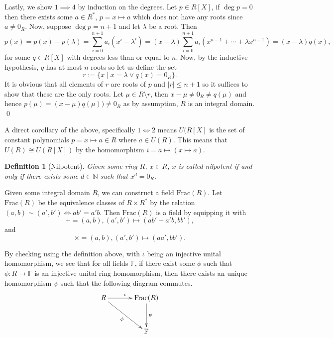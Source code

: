 \documentclass[
]{article}
\newtheorem{definition}{Definition}[theorem]
\begin{document}
Lastly, we show \(1 \implies 4\) by induction on the degrees. Let
\(p \in R[X]\), if \(\deg p = 0\) then there exists some \(a \in R^*\),
\(p = x \mapsto a\) which does not have any roots since \(a \neq 0_R\).
Now, suppose \(\deg p = n + 1\) and let \(\lambda\) be a root. Then \[
    p(x) = p(x) - p(\lambda) = \sum_{i = 0}^{n + 1} a_i (x^i - \lambda ^ i)
      = (x - \lambda) \sum_{i = 0}^{n + 1} a_i (x^{n - 1} + \cdots + \lambda x ^{n - 1})
      = (x - \lambda) q(x),
  \] for some \(q \in R[X]\) with degrees less than or equal to \(n\).
Now, by the inductive hypothesis, \(q\) has at most \(n\) roots so let
us define the set \[r := \{ x \mid x = \lambda \vee q(x) = 0_R \}. \] It
is obvious that all elements of \(r\) are roots of \(p\) and
\(\mid r \mid \leq n + 1\) so it suffices to show that these are the
only roots. Let \(\mu \in R \setminus r\), then
\(x - \mu \neq 0_R \neq q(\mu)\) and hence
\(p(\mu) = (x - \mu) q(\mu)) \neq 0_R\) as by assumption, \(R\) is an
integral domain. \qed

A direct corollary of the above, specifically \(1 \iff 2\) means
\(U(R[X]\) is the set of constant polynomials \(p = x \mapsto a \in R\)
where \(a \in U(R)\). This means that \(U(R) \cong U(R[X])\) by the
homomorphism \(i = a \mapsto (x \mapsto a)\).

\begin{definition}[Nilpotent]
  Given some ring \(R\), \(x \in R\), \(x\) is called nilpotent if and only if 
  there exists some \(d \in \mathbb{N}\) such that \(x^d = 0_R\).
\end{definition}

Given some integral domain \(R\), we can construct a field
\(\text{Frac}(R)\). Let \(\text{Frac}(R)\) be the equivalence classes of
\(R \times R^*\) by the relation
\((a, b) \sim (a', b') \iff ab' = a'b\). Then \(\text{Frac}(R)\) is a
field by equipping it with
\[+ = (a, b), (a', b') \mapsto (ab' + a'b, bb'),\] and
\[\times = (a, b), (a', b') \mapsto (aa', bb').\]

By checking using the definition above, with \(\iota\) being an
injective unital homomorphism, we see that for all fields
\(\mathbb{F}\), if there exist some \(\phi\) such that
\(\phi : R \to \mathbb{F}\) is an injective unital ring homomorphism,
then there exists an unique homomorphism \(\psi\) such that the
following diagram commutes. \[
\xymatrix @ R=1.2cm @ C=1.2cm {
 R \ar[r]^{\iota} \ar[rd]_{\phi} & \text{Frac}(R) \ar[d]^{\psi} \\
                                 & \mathbb{F} \\
}
\]
\end{document}
